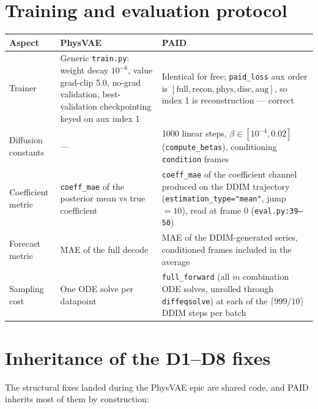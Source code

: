 \documentclass[11pt,a4paper]{article}
\newcommand{\code}[1]{\texttt{#1}}
\begin{document}
\section{Training and evaluation protocol}

\begin{table}[h]
\centering
\small
\begin{tabularx}{\textwidth}{LXX}
\toprule
\textbf{Aspect} & \textbf{PhysVAE} & \textbf{PAID} \\
\midrule
Trainer & Generic \code{train.py}: weight decay $10^{-6}$, value grad-clip 5.0, no-grad validation, best-validation checkpointing keyed on aux index 1 & Identical for free; \code{paid\_loss} aux order is $[\text{full}, \text{recon}, \text{phys}, \text{disc}, \text{aug}]$, so index 1 is reconstruction --- correct \\
Diffusion constants & --- & 1000 linear steps, $\beta \in [10^{-4}, 0.02]$ (\code{compute\_betas}), conditioning \code{condition} frames \\
Coefficient metric & \code{coeff\_mae} of the posterior mean vs true coefficient & \code{coeff\_mae} of the coefficient channel produced on the DDIM trajectory (\code{estimation\_type="mean"}, jump $= 10$), read at frame 0 (\code{eval.py:39--50}) \\
Forecast metric & MAE of the full decode & MAE of the DDIM-generated series, conditioned frames included in the average \\
Sampling cost & One ODE solve per datapoint & \code{full\_forward} (all $m$ combination ODE solves, unrolled through \code{diffeqsolve}) at each of the $\lceil 999/10 \rceil$ DDIM steps per batch \\
\bottomrule
\end{tabularx}
\end{table}

\section{Inheritance of the D1--D8 fixes}

The structural fixes landed during the PhysVAE epic are shared code, and PAID
inherits most of them by construction:
\end{document}
